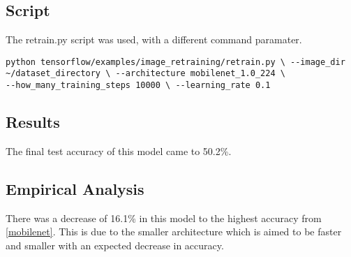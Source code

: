 \subsection*{Script}
The retrain.py script \textcite{retrainInception} was used, with a different
command paramater.

\begin{lstlisting}
python tensorflow/examples/image_retraining/retrain.py \ --image_dir
~/dataset_directory \ --architecture mobilenet_1.0_224 \
--how_many_training_steps 10000 \ --learning_rate 0.1
\end{lstlisting}

\subsection*{Results}
The final test accuracy of this model came to 50.2\%.

\subsection*{Empirical Analysis}
There was a decrease of 16.1\% in this model to the highest accuracy from
\ref{mobilenet}. This is due to the smaller architecture which is aimed to be faster
and smaller with an expected decrease in accuracy.
